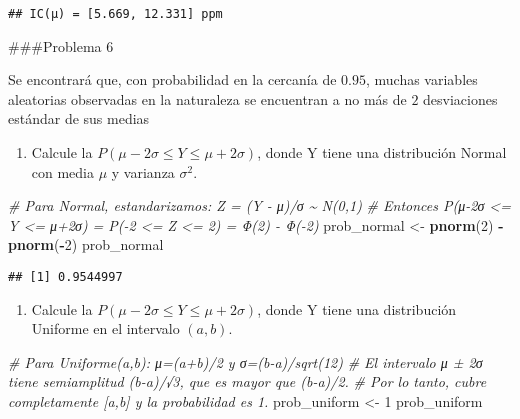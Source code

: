 \documentclass[
]{article}
\newenvironment{Shaded}{\begin{snugshade}}{\end{snugshade}}
\newcommand{\CommentTok}[1]{\textcolor[rgb]{0.56,0.35,0.01}{\textit{#1}}}
\newcommand{\DecValTok}[1]{\textcolor[rgb]{0.00,0.00,0.81}{#1}}
\newcommand{\FunctionTok}[1]{\textcolor[rgb]{0.13,0.29,0.53}{\textbf{#1}}}
\newcommand{\NormalTok}[1]{#1}
\newcommand{\OtherTok}[1]{\textcolor[rgb]{0.56,0.35,0.01}{#1}}
\newcommand{\SpecialCharTok}[1]{\textcolor[rgb]{0.81,0.36,0.00}{\textbf{#1}}}
\providecommand{\tightlist}{%
  \setlength{\itemsep}{0pt}\setlength{\parskip}{0pt}}
\begin{document}
\begin{verbatim}
## IC(μ) = [5.669, 12.331] ppm
\end{verbatim}

\#\#\#Problema 6

Se encontrará que, con probabilidad en la cercanía de \(0.95\), muchas
variables aleatorias observadas en la naturaleza se encuentran a no más
de \(2\) desviaciones estándar de sus medias

\begin{enumerate}
\def\labelenumi{\alph{enumi})}
\tightlist
\item
  Calcule la \(P(\mu − 2\sigma ≤ Y ≤ \mu + 2\sigma)\), donde Y tiene una
  distribución Normal con media \(\mu\) y varianza \(\sigma^2\).
\end{enumerate}

\begin{Shaded}
\begin{Highlighting}[]
\CommentTok{\# Para Normal, estandarizamos: Z = (Y {-} μ)/σ \textasciitilde{} N(0,1)}
\CommentTok{\# Entonces P(μ{-}2σ \textless{}= Y \textless{}= μ+2σ) = P({-}2 \textless{}= Z \textless{}= 2) = Φ(2) {-} Φ({-}2)}
\NormalTok{prob\_normal }\OtherTok{\textless{}{-}} \FunctionTok{pnorm}\NormalTok{(}\DecValTok{2}\NormalTok{) }\SpecialCharTok{{-}} \FunctionTok{pnorm}\NormalTok{(}\SpecialCharTok{{-}}\DecValTok{2}\NormalTok{)}
\NormalTok{prob\_normal}
\end{Highlighting}
\end{Shaded}

\begin{verbatim}
## [1] 0.9544997
\end{verbatim}

\begin{enumerate}
\def\labelenumi{\alph{enumi})}
\setcounter{enumi}{1}
\tightlist
\item
  Calcule la \(P(\mu − 2\sigma ≤ Y ≤ \mu + 2\sigma)\), donde Y tiene una
  distribución Uniforme en el intervalo \((a,b)\).
\end{enumerate}

\begin{Shaded}
\begin{Highlighting}[]
\CommentTok{\# Para Uniforme(a,b): μ=(a+b)/2 y σ=(b{-}a)/sqrt(12)}
\CommentTok{\# El intervalo μ ± 2σ tiene semiamplitud (b{-}a)/√3, que es mayor que (b{-}a)/2.}
\CommentTok{\# Por lo tanto, cubre completamente [a,b] y la probabilidad es 1.}
\NormalTok{prob\_uniform }\OtherTok{\textless{}{-}} \DecValTok{1}
\NormalTok{prob\_uniform}
\end{Highlighting}
\end{Shaded}
\end{document}
